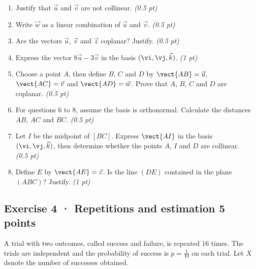 \begin{enumerate}

\item Justify that $\vec u$ and $\vec v$ are not collinear. \hfill\textit{(0.5 pt)}

\item Write $\vec w$ as a linear combination of $\vec u$ and $\vec v$. \hfill\textit{(0.5 pt)}

\item Are the vectors $\vec u$, $\vec v$ and $\vec z$ coplanar? Justify. \hfill\textit{(0.5 pt)}

\item Express the vector $8\vec u-3\vec v$ in the basis $(\vi,\vj,\vec k)$. \hfill\textit{(1 pt)}

\item Choose a point $A$, then define $B$, $C$ and $D$ by $\vect{AB}=\vec u$, $\vect{AC}=\vec v$ and $\vect{AD}=\vec w$. Prove that $A$, $B$, $C$ and $D$ are coplanar. \hfill\textit{(0.5 pt)}

\item For questions 6 to 8, assume the basis is orthonormal. Calculate the distances $AB$, $AC$ and $BC$. \hfill\textit{(0.5 pt)}

\item Let $I$ be the midpoint of $[BC]$. Express $\vect{AI}$ in the basis $(\vi,\vj,\vec k)$, then determine whether the points $A$, $I$ and $D$ are collinear. \hfill\textit{(0.5 pt)}

\item Define $E$ by $\vect{AE}=\vec z$. Is the line $(DE)$ contained in the plane $(ABC)$? Justify. \hfill\textit{(1 pt)}

\end{enumerate}

\subsection*{Exercise 4 · Repetitions and estimation \hfill 5 points}A trial with two outcomes, called success and failure, is repeated $16$ times. The trials are independent and the probability of success is $p=\frac{1}{10}$ on each trial. Let $X$ denote the number of successes obtained.

